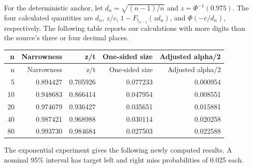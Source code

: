 For the deterministic anchor, let $d_n=\sqrt{(n-1)/n}$ and $z=\Phi^{-1}(0.975)$. The four calculated quantities are $d_n$, $z/c$, $1-F_{t_{n-1}}(zd_n)$, and $\Phi(-c/d_n)$, respectively. The following table reports our calculations with more digits than the source's three or four decimal places.

{\small\setlength{\tabcolsep}{3pt}
\begin{longtable}{@{}rrrrr@{}}
\toprule

n & Narrowness & z/t & One-sided size & Adjusted alpha/2 \\
\midrule
\endfirsthead
\toprule
n & Narrowness & z/t & One-sided size & Adjusted alpha/2 \\
\midrule
\endhead

5 & 0.894427 & 0.705926 & 0.077233 & 0.000954 \\

10 & 0.948683 & 0.866414 & 0.047954 & 0.008551 \\

20 & 0.974679 & 0.936427 & 0.035651 & 0.015881 \\

40 & 0.987421 & 0.968988 & 0.030114 & 0.020258 \\

80 & 0.993730 & 0.984684 & 0.027503 & 0.022588 \\

\bottomrule
\end{longtable}
}

The exponential experiment gives the following newly computed results. A nominal 95\% interval has target left and right miss probabilities of 0.025 each.

